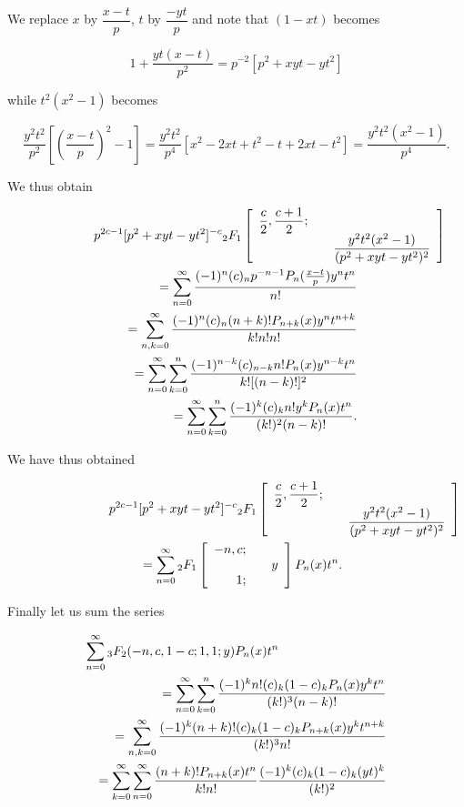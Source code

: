 \begin{solution}
We replace $x$ by $\dfrac{x-t}{p}$, $t$ by $\dfrac{-yt}{p}$ and note that $(1-xt)$ becomes 

$$1 + \dfrac{yt(x-t)}{p^2} = p^{-2} [p^2 + xyt - yt^2]$$

while $t^2(x^2-1)$ becomes

$$\dfrac{y^2t^2}{p^2} \left[ \left( \dfrac{x-t}{p} \right)^2 - 1 \right] = \dfrac{y^2 t^2}{p^4} [ x^2-2xt+t^2-t+2xt-t^2] = \dfrac{y^2 t^2 (x^2-1)}{p^4}.$$

We thus obtain 

\begin{eqnarray*}
\lefteqn{\!\!\!\!\!\!\!\!\!\!p^{2c-1} [p^2+xyt-yt^2]^{-c} {}_2F_1 \left[ \begin{array}{rlr} 
\dfrac{c}{2}, \dfrac{c+1}{2}; & & \\
& & \dfrac{y^2t^2(x^2-1)}{(p^2+xyt-yt^2)^2}
\end{array} \right]} \\
& &= \displaystyle\sum_{n=0}^{\infty} \dfrac{(-1)^n (c)_n p^{-n-1} P_n (\frac{x-t}{p}) y^n t^n}{n!} \\
&&= \displaystyle\sum_{n,k=0}^{\infty} \dfrac{(-1)^n (c)_n (n+k)! P_{n+k}(x) y^n t^{n+k}}{k! n! n!} \\
&&= \displaystyle\sum_{n=0}^{\infty} \displaystyle\sum_{k=0}^n \dfrac{(-1)^{n-k} (c)_{n-k} n! P_n(x) y^{n-k} t^n}{k! [(n-k)!]^2} \\
&&= \displaystyle\sum_{n=0}^{\infty} \displaystyle\sum_{k=0}^n \dfrac{(-1)^k (c)_k n! y^k P_n(x)t^n}{(k!)^2 (n-k)!}.
\end{eqnarray*}

We have thus obtained

\begin{eqnarray*}
\lefteqn{\!\!\!\!\!\!\!\!\!\!p^{2c-1}[p^2+xyt-yt^2]^{-c} {}_2F_1 \left[ \begin{array}{rlr} 
\dfrac{c}{2}, \dfrac{c+1}{2}; \\
& & \dfrac{y^2 t^2 (x^2-1)}{(p^2+xyt-yt^2)^2}
\end{array} \right]} \\
&& = \displaystyle\sum_{n=0}^{\infty} {}_2F_1 \left[ \begin{array}{rlr} 
-n, c; & & \\
& & y \\
1; & & 
\end{array} \right] P_n(x) t^n.
\end{eqnarray*}

Finally let us sum the series

\begin{eqnarray*}
\lefteqn{\displaystyle\sum_{n=0}^{\infty} {}_3F_2(-n, c, 1-c;1,1;y) P_n(x) t^n} \\
& &= \displaystyle\sum_{n=0}^{\infty} \displaystyle\sum_{k=0}^n \dfrac{(-1)^k n! (c)_k (1-c)_k P_n(x) y^k t^n}{(k!)^3 (n-k)!} \\
& &= \displaystyle\sum_{n,k=0}^{\infty} \dfrac{(-1)^k (n+k)! (c)_k (1-c)_k P_{n+k}(x) y^k t^{n+k}}{(k!)^3 n!} \\
& &= \displaystyle\sum_{k=0}^{\infty} \displaystyle\sum_{n=0}^{\infty} \dfrac{(n+k)!P_{n+k}(x)t^n}{k!n!} \dfrac{(-1)^k (c)_k (1-c)_k (yt)^k}{(k!)^2}
\end{eqnarray*}


\end{solution}
